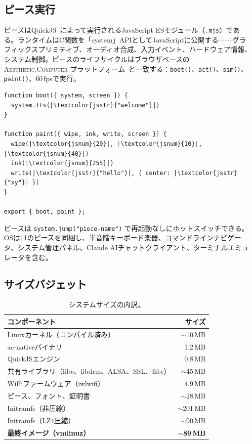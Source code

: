 \documentclass[10pt,letterpaper,twocolumn]{article}
\newcommand{\ac}{\textsc{Aesthetic.Computer}}
\begin{document}
\subsection{ピース実行}

ピースはQuickJS~\citep{bellard2005quickjs}によって実行されるJavaScript ESモジュール（\texttt{.mjs}）である。ランタイムはC関数を「system」APIとしてJavaScriptに公開する——グラフィックスプリミティブ、オーディオ合成、入力イベント、ハードウェア情報、システム制御。ピースのライフサイクルはブラウザベースの \ac{} プラットフォーム~\citep{scudder2026ac}と一致する：\texttt{boot()}、\texttt{act()}、\texttt{sim()}、\texttt{paint()}、60\,fpsで実行。

\begin{lstlisting}[style=acjsstyle]
function boot({ system, screen }) {
  system.tts(|\textcolor{jsstr}{"welcome"}|)
}

function paint({ wipe, ink, write, screen }) {
  wipe(|\textcolor{jsnum}{20}|, |\textcolor{jsnum}{10}|, |\textcolor{jsnum}{40}|)
  ink(|\textcolor{jsnum}{255}|)
  write(|\textcolor{jsstr}{"hello"}|, { center: |\textcolor{jsstr}{"xy"}| })
}

export { boot, paint };
\end{lstlisting}

ピースは \texttt{system.jump("piece-name")} で再起動なしにホットスイッチできる。OSは11のピースを同梱し、半音階キーボード楽器、コマンドラインナビゲータ、システム管理パネル、Claude AIチャットクライアント、ターミナルエミュレータを含む。

\subsection{サイズバジェット}

\begin{table}[h]
\small
\centering
\begin{tabular}{lr}
\toprule
\textbf{コンポーネント} & \textbf{サイズ} \\
\midrule
Linuxカーネル（コンパイル済み） & $\sim$10\,MB \\
ac-nativeバイナリ & 1.2\,MB \\
QuickJSエンジン & 0.8\,MB \\
共有ライブラリ（libc、libdrm、ALSA、SSL、flite） & $\sim$45\,MB \\
WiFiファームウェア（iwlwifi） & 4.9\,MB \\
ピース、フォント、証明書 & $\sim$28\,MB \\
\midrule
Initramfs（非圧縮） & $\sim$201\,MB \\
Initramfs（LZ4圧縮） & $\sim$90\,MB \\
\textbf{最終イメージ（vmlinuz）} & \textbf{$\sim$89\,MB} \\
\bottomrule
\end{tabular}
\caption{システムサイズの内訳。}
\label{tab:size}
\end{table}
\end{document}
